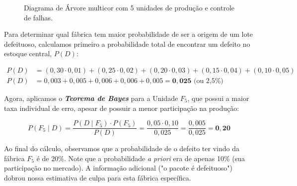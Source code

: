 \begin{figure}[H]
\caption{Diagrama de Árvore multicor com 5 unidades de produção e controle de falhas.}
\end{figure}


Para determinar qual fábrica tem maior probabilidade de ser a origem de um lote defeituoso, calculamos primeiro a probabilidade total de encontrar um defeito no estoque central, $P(D)$:


$$\begin{aligned}
P(D) &= (0,30 \cdot 0,01) + (0,25 \cdot 0,02) + (0,20 \cdot 0,03) + (0,15 \cdot 0,04) + (0,10 \cdot 0,05) \\
P(D) &= 0,003 + 0,005 + 0,006 + 0,006 + 0,005 = \mathbf{0,025} \text{ (ou 2,5\%)}
\end{aligned}$$

Agora, aplicamos o \textbf{\textit{Teorema de Bayes}} para a Unidade $F_5$, que possui a maior taxa individual de erro, apesar de possuir a menor participação na produção:

$$P(F_5 \mid D) = \frac{P(D \mid F_5) \cdot P(F_5)}{P(D)} = \frac{0,05 \cdot 0,10}{0,025} = \frac{0,005}{0,025} = \mathbf{0,20}$$


Ao final do cálculo, observamos que a probabilidade de o defeito ter vindo da fábrica $F_5$ é de 20\%. Note que a probabilidade \textit{a priori} era de apenas 10\% (sua participação no mercado). A informação adicional ("o pacote é defeituoso") dobrou nossa estimativa de culpa para esta fábrica específica.











